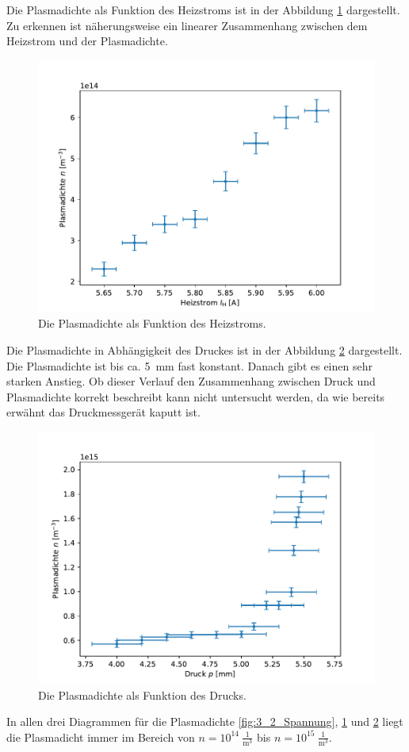 Die Plasmadichte als Funktion des Heizstroms ist in der Abbildung \ref{fig:3_2_Strom} dargestellt. Zu erkennen ist  näherungsweise ein linearer Zusammenhang zwischen dem Heizstrom und der Plasmadichte.  
\begin{figure}[H]
\centering
\includegraphics[scale=0.6]{3_2_Strom.pdf}
\caption{Die Plasmadichte als Funktion des Heizstroms.}
\label{fig:3_2_Strom}
\end{figure}
Die Plasmadichte in Abhängigkeit des Druckes ist in der Abbildung \ref{fig:3_2_Druck} dargestellt. Die Plasmadichte ist bis ca. \SI{5}{mm} fast konstant. Danach gibt es einen sehr starken Anstieg. Ob dieser Verlauf den Zusammenhang zwischen Druck und Plasmadichte korrekt beschreibt kann nicht untersucht werden, da wie bereits erwähnt das Druckmessgerät kaputt ist. 
\begin{figure}[H]
\centering
\includegraphics[scale=0.6]{3_2_Druck.pdf}
\caption{Die Plasmadichte als Funktion des Drucks.}
\label{fig:3_2_Druck}
\end{figure}
In allen drei Diagrammen für die Plasmadichte  \ref{fig:3_2_Spannung}, \ref{fig:3_2_Strom} und  \ref{fig:3_2_Druck} liegt die Plasmadicht immer im Bereich von $n=10^{14}\ \frac{1}{\mathrm{m}^3}$ bis  $n=10^{15}\ \frac{1}{\mathrm{m}^3}$.
